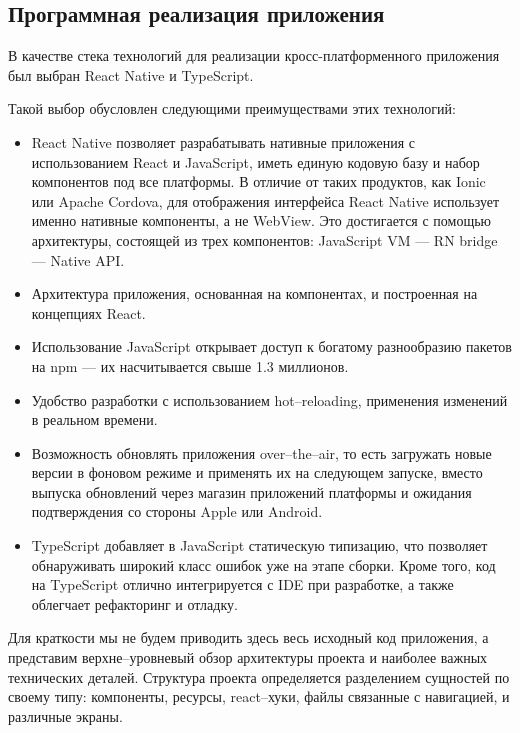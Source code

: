 \subsection{Программная реализация приложения}
В качестве стека технологий для реализации кросс-платформенного приложения был выбран React Native и TypeScript. 

Такой выбор обусловлен следующими преимуществами этих технологий:
\begin{itemize}
	\item React Native позволяет разрабатывать нативные приложения с использованием React и JavaScript, иметь единую кодовую базу и набор компонентов под все платформы. В отличие от таких продуктов, как Ionic или Apache Cordova, для отображения интерфейса React Native использует именно нативные компоненты, а не WebView. Это достигается с помощью архитектуры, состоящей из трех компонентов: JavaScript VM --- RN bridge --- Native API.
	\item Архитектура приложения, основанная на компонентах, и построенная на концепциях React.
	\item Использование JavaScript открывает доступ к богатому разнообразию пакетов на npm --- их насчитывается свыше 1.3 миллионов.
	\item Удобство разработки с использованием hot--reloading, применения изменений в реальном времени.
	\item Возможность обновлять приложения over--the--air, то есть загружать новые версии в фоновом режиме и применять их на следующем запуске, вместо выпуска обновлений через магазин приложений платформы и ожидания подтверждения со стороны Apple или Android.
	\item TypeScript добавляет в JavaScript статическую типизацию, что позволяет обнаруживать широкий класс ошибок уже на этапе сборки. Кроме того, код на TypeScript отлично интегрируется с IDE при разработке, а также облегчает рефакторинг и отладку.
\end{itemize}

Для краткости мы не будем приводить здесь весь исходный код приложения, а представим верхне--уровневый обзор архитектуры проекта и наиболее важных технических деталей.
Структура проекта определяется разделением сущностей по своему типу: компоненты, ресурсы, react--хуки, файлы связанные с навигацией, и различные экраны. %

